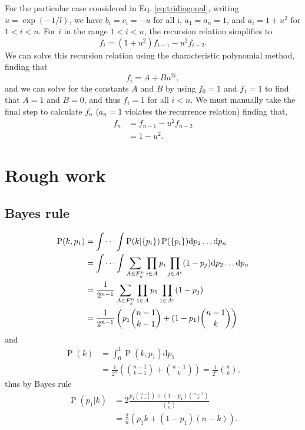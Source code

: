 \documentclass[fleqn,usenatbib]{mnras}
\begin{document}
For the particular case considered in Eq. \ref{eq:tridiagonal}, writing $u=\exp(-1/l)$, we have $b_i=c_i=-u$ for all i, $a_1 = a_n = 1$, and $a_i=1+u^2$ for $1<i<n$. For $i$ in the range $1<i<n$, the recursion relation simplifies to
\begin{equation}
    f_i = (1+u^2)f_{i-1}-u^2f_{i-2}.
\end{equation}
We can solve this recursion relation using the characteristic polynomial method, finding that
\begin{equation}
    f_i = A+Bu^{2i},
\end{equation}
and we can solve for the constants $A$ and $B$ by using $f_0=1$ and $f_1=1$ to find that $A=1$ and $B=0$, and thus $f_i=1$ for all $i<n$. We must manually take the final step to calculate $f_n$ ($a_n=1$ violates the recurrence relation) finding that,
\begin{align}
    f_n &= f_{n-1} - u^2f_{n-2} \nonumber \\
        &= 1 - u^2.
\end{align}

\section{Rough work}

\subsection{Bayes rule}

\begin{align}
    \operatorname{P}(k,p_1) &= \idotsint \operatorname{P}(k|\{p_i\}) \operatorname{P}(\{p_i\})\mathrm{d}p_2 \dots \mathrm{d}p_n  \\
    &= \idotsint \sum_{A\in F_k^n} \prod_{i\in A} p_i \prod_{j\in A^{\mathrm{c}}} (1-p_j) \mathrm{d}p_2 \dots \mathrm{d}p_n \\
    &= \frac{1}{2^{n-1}} \sum_{A\in F_k^n} \prod_{1\in A} p_1 \prod_{1\in A^{\mathrm{c}}} (1-p_j) \\
    &= \frac{1}{2^{n-1}} \left( p_1 \binom{n-1}{k-1} + (1-p_1)\binom{n-1}{k} \right) \label{eq:marginal}\\ 
\end{align}
and 
\begin{align}
    \operatorname{P}(k) &= \int_0^1 \operatorname{P}(k,p_1) \mathrm{d}p_1 \\
    &= \frac{1}{2^{n}}\left( \binom{n-1}{k-1} + \binom{n-1}{k} \right) = \frac{1}{2^{n}}\binom{n}{k},
\end{align}
thus by Bayes rule
\begin{align}
    \operatorname{P}(p_1|k) &= 2\frac{p_1 \binom{n-1}{k-1} + (1-p_1)\binom{n-1}{k}}{\binom{n}{k}} \\
    &= \frac{2}{n}\left(p_1k+(1-p_1)(n-k)\right).
\end{align}
\end{document}
